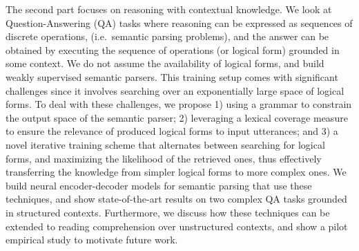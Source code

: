 The second part focuses on reasoning with contextual knowledge. We look at Question-Answering (QA) tasks where reasoning can be expressed as sequences of discrete operations, 
(i.e.\ semantic parsing problems), and the answer can be obtained by executing the sequence of operations (or logical form) grounded in some context.
We do not assume the availability of logical forms, and build weakly supervised semantic parsers. This training setup comes with significant challenges since it involves searching over an exponentially
large space of logical forms. To deal with these challenges, we propose 1) using a grammar to constrain the output space of the semantic parser; 2) leveraging a lexical coverage measure to ensure the
relevance of produced logical forms to input utterances; and 3) a novel iterative training scheme that alternates between searching for logical forms, and maximizing the likelihood of the retrieved ones, thus effectively transferring
the knowledge from simpler logical forms to more complex ones. We build neural encoder-decoder models for semantic parsing that use these techniques, and show state-of-the-art results on two complex QA tasks grounded in
structured contexts. Furthermore, we discuss how these techniques can be extended to reading comprehension over unstructured contexts, and show a pilot empirical study to motivate future work.
